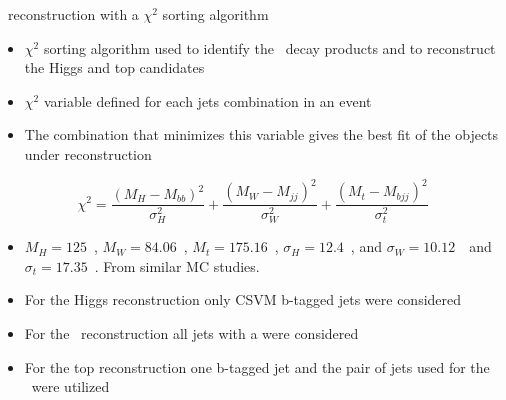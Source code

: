 
\begin{frame}{\Tp~reconstruction with a $\chi^{2}$ sorting algorithm}
\vspace{-.2cm}
\scriptsize

\begin{itemize}
\item $\chi^{2}$ sorting algorithm used to identify the \Tp~decay products and to reconstruct the Higgs and top candidates
\item $\chi^{2}$ variable defined for each jets combination in an event
\item The combination that minimizes this variable gives the best fit of the objects under reconstruction
\end{itemize}

\begin{equation*}
\chi^{2}=\frac{(M_{H}-M_{bb})^{2}}{\sigma_{H}^{2}}+\frac{(M_{W}-M_{jj})^{2}}{\sigma_{W}^{2}}+\frac{(M_{t}-M_{bjj})^{2}}{\sigma_{t}^{2}}
\end{equation*}

\begin{itemize}
\item $M_{H}=125$~\GeVcc, $M_{W}=84.06$~\GeVcc, $M_{t}=175.16$~\GeVcc, $\sigma_{H}=12.4$~\GeVcc, and $\sigma_{W}=10.12$~\GeVcc~and $\sigma_{t}=17.35$~\GeVcc. From similar MC studies.
\item For the Higgs reconstruction only CSVM b-tagged jets were considered
\item For the \W~reconstruction all jets with a  were considered
\item For the top reconstruction one b-tagged jet and the pair of jets used for the \W~were utilized
\end{itemize}

\end{frame}


